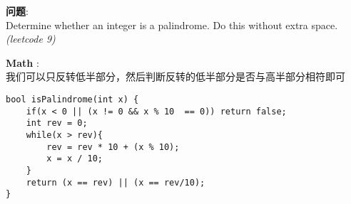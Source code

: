     
\begin{description}
    \item{\textbf{问题}}:\\
Determine whether an integer is a palindrome. Do this without extra space.\\
\textit{(leetcode 9)}
    \item{\textbf{Math}} : 
    \\我们可以只反转低半部分，然后判断反转的低半部分是否与高半部分相符即可
    \begin{lstlisting}
bool isPalindrome(int x) {
	if(x < 0 || (x != 0 && x % 10  == 0)) return false;
	int rev = 0;
	while(x > rev){
		rev = rev * 10 + (x % 10);
		x = x / 10;
	}
	return (x == rev) || (x == rev/10);
}
    \end{lstlisting}
\end{description}
